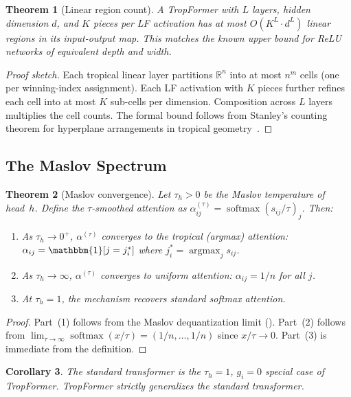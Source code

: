\documentclass[11pt,twocolumn]{article}
\newtheorem{theorem}{Theorem}[section]
\newtheorem{corollary}[theorem]{Corollary}
\newcommand{\R}{\mathbb{R}}
\newcommand{\softmax}{\operatorname{softmax}}
\newcommand{\argmax}{\operatorname{argmax}}
\begin{document}
\begin{theorem}[Linear region count]\label{thm:regions}
A TropFormer with $L$ layers, hidden dimension $d$, and $K$ pieces per LF
activation has at most $O(K^L \cdot d^L)$ linear regions in its input-output
map. This matches the known upper bound for ReLU networks of equivalent
depth and width.
\end{theorem}

\begin{proof}[Proof sketch]
Each tropical linear layer partitions $\R^n$ into at most $n^m$ cells (one per
winning-index assignment). Each LF activation with $K$ pieces further refines
each cell into at most $K$ sub-cells per dimension. Composition across $L$
layers multiplies the cell counts. The formal bound follows from
Stanley's counting theorem for hyperplane arrangements in tropical
geometry~\cite{maclagan2015introduction}.
\end{proof}

\subsection{The Maslov Spectrum}

\begin{theorem}[Maslov convergence]\label{thm:maslov}
Let $\tau_h > 0$ be the Maslov temperature of head~$h$. Define the
$\tau$-smoothed attention as
$\alpha_{ij}^{(\tau)} = \softmax(s_{ij}/\tau)_j$.
Then:
\begin{enumerate}[nosep]
  \item As $\tau_h \to 0^+$, $\alpha^{(\tau)}$ converges to the tropical
    (argmax) attention: $\alpha_{ij} = \mathbbm{1}[j = j^*_i]$ where
    $j^*_i = \argmax_j s_{ij}$.
  \item As $\tau_h \to \infty$, $\alpha^{(\tau)}$ converges to uniform
    attention: $\alpha_{ij} = 1/n$ for all $j$.
  \item At $\tau_h = 1$, the mechanism recovers standard softmax attention.
\end{enumerate}
\end{theorem}

\begin{proof}
Part~(1) follows from the Maslov dequantization limit
(). Part~(2) follows from
$\lim_{\tau \to \infty} \softmax(x/\tau) = (1/n, \ldots, 1/n)$ since
$x/\tau \to 0$. Part~(3) is immediate from the definition.
\end{proof}

\begin{corollary}\label{cor:classical-special}
The standard transformer is the $\tau_h = 1$, $g_i = 0$ special case of
TropFormer. TropFormer strictly generalizes the standard transformer.
\end{corollary}
\end{document}
